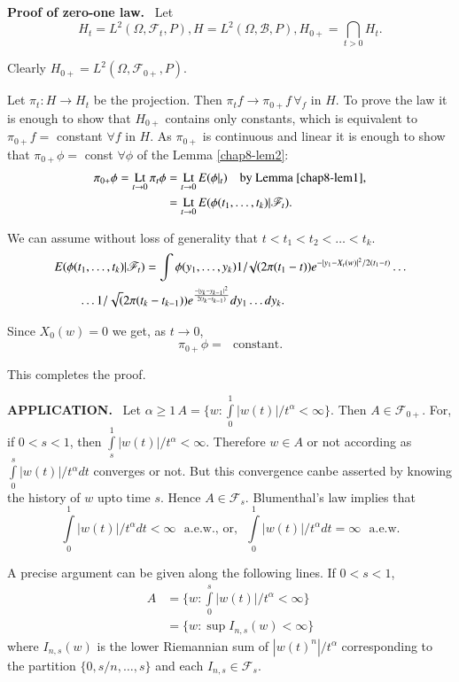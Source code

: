 \medskip
\noindent
{\bf Proof of zero-one law.}~ Let\pageoriginale 
$$
H_{t}=L^{2}(\Omega,\mathscr{F}_{t},P),H=L^{2}(\Omega,\mathscr{B},P),H_{0+}=\bigcap\limits_{t>0}H_{t}. 
$$

Clearly $H_{0+}=L^{2}(\Omega,\mathscr{F}_{0+},P)$.

Let $\pi_{t}:H\to H_{t}$ be the projection. Then $\pi_{t}f\to
\pi_{0+}f\,\forall_{f}$ in $H$. To prove the law it is enough to show
that $H_{0+}$ contains only constants, which is equivalent to
$\pi_{0+}f=$ constant $\forall f$ in $H$. As $\pi_{0+}$ is continuous
and linear it is enough to show that $\pi_{0+}\phi=$ const $\forall
\phi$ of the Lemma \ref{chap8-lem2}:
\begin{align*}
\pi_{0+}\phi=\operatorname*{Lt}\limits_{t\to 0}\pi_{t}\phi &= \operatorname*{Lt}\limits_{t\to
  0}E(\phi|{}_{t})\quad\text{by Lemma \ref{chap8-lem1},}\\
&= \operatorname*{Lt}\limits_{t\to 0}E(\phi(t_{1},\ldots,t_{k})|\mathscr{F}_{t}).
\end{align*}

We can assume without loss of generality that $t<t_{1}<t_{2}<\ldots<
t_{k}$. 
{\fontsize{10pt}{12pt}\selectfont
\begin{align*}
&
  E(\phi(t_{1},\ldots,t_{k})|\mathscr{F}_{t})=\int\phi(y_{1},\ldots,y_{k})1/\surd
  (2\pi(t_{1}-t))e^{-|y_{1}-X_{t}(w)|^{2}/2(t_{1}-t)}\ldots\\
&\qquad \ldots
  1/\sqrt(2\pi(t_{k}-t_{k-1}))e^{\frac{-|y_{k}-y_{k-1}|^{2}}{2(t_{k}-t_{k-1})}}dy_{1}\ldots
    dy_{k}. 
\end{align*}}\relax

Since $X_{0}(w)=0$ we get, as $t\to 0$,
$$
\pi_{0+}\phi=\text{~ constant.}
$$

This completes the proof.

\medskip
\noindent
{\bf APPLICATION.}~ Let $\alpha\geq
1\,A=\{w:\int\limits^{1}_{0}|w(t)|/t^{\alpha}<\infty\}$. Then $A\in
\mathscr{F}_{0+}$. For, if $0<s<1$, then
$\int\limits^{1}_{s}|w(t)|/t^{\alpha}<\infty$. Therefore $w\in A$ or
not according as $\int\limits^{s}_{0}|w(t)|/t^{\alpha}dt$ converges or
not. But this convergence can\pageoriginale be asserted by knowing the
history of $w$ upto time $s$. Hence $A\in
\mathscr{F}_{s}$. Blumenthal's law implies that
$$
\int\limits^{1}_{0}|w(t)|/t^{\alpha}dt<\infty\text{~ a.e.w., or,~ }
\int\limits^{1}_{0}|w(t)|/t^{\alpha}dt=\infty\text{~ a.e.w.}
$$

A precise argument can be given along the following lines. If $0<s<1$,
\begin{align*}
A &= \{w:\int\limits^{s}_{0}|w(t)|/t^{\alpha}<\infty\}\\
&= \{w:\sup I_{n,s}(w)<\infty\}
\end{align*}
where $I_{n,s}(w)$ is the lower Riemannian sum of
$|w(t)^{n}|/t^{\alpha}$ corresponding to the partition
$\{0,s/n,\ldots,s\}$ and each $I_{n,s}\in \mathscr{F}_{s}$.
